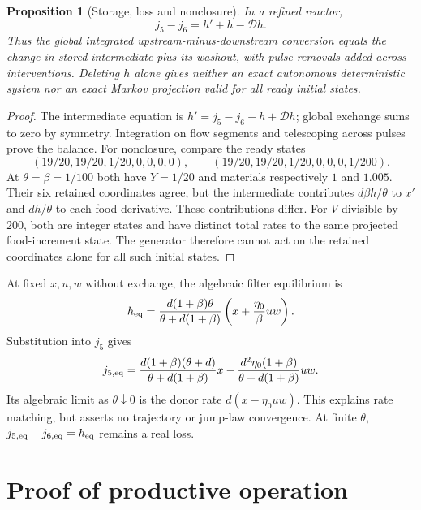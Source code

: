 \documentclass[11pt]{article}
\newtheorem{proposition}[theorem]{Proposition}
\theoremstyle{definition}\newtheorem{definition}[theorem]{Definition}
\begin{document}
\begin{proposition}[Storage, loss and nonclosure]\label{prop:storage}
In a refined reactor,
\[
j_5-j_6=h'+h-\mathcal Dh.
\]
Thus the global integrated upstream-minus-downstream conversion equals the change
in stored intermediate plus its washout, with pulse removals added across interventions.
Deleting $h$ alone gives neither an exact autonomous deterministic system nor an
exact Markov projection valid for all ready initial states.
\end{proposition}
\begin{proof}
The intermediate equation is $h'=j_5-j_6-h+\mathcal Dh$; global exchange sums to
zero by symmetry. Integration on flow segments and telescoping across pulses prove
the balance. For nonclosure, compare the ready states
\[
(19/20,19/20,1/20,0,0,0,0),\qquad
(19/20,19/20,1/20,0,0,0,1/200).
\]
At $\theta=\beta=1/100$ both have $Y=1/20$ and materials respectively $1$ and
$1.005$. Their six retained coordinates agree, but the intermediate contributes
$d\beta h/\theta$ to $x'$ and $dh/\theta$ to each food derivative. These contributions
differ. For $V$ divisible by $200$, both are integer states and have distinct total
rates to the same projected food-increment state. The generator therefore cannot
act on the retained coordinates alone for all such initial states.
\end{proof}
At fixed $x,u,w$ without exchange, the algebraic filter equilibrium is
\[
h_{\rm eq}=\frac{d(1+\beta)\theta}{\theta+d(1+\beta)}
\left(x+\frac{\eta_0}{\beta}uw\right).
\]
Substitution into $j_5$ gives
\[
j_{5,\rm eq}=\frac{d(1+\beta)(\theta+d)}{\theta+d(1+\beta)}x
-\frac{d^2\eta_0(1+\beta)}{\theta+d(1+\beta)}uw.
\]
Its algebraic limit as $\theta\downarrow0$ is the donor rate $d(x-\eta_0uw)$.
This explains rate matching, but asserts no trajectory or jump-law convergence.
At finite $\theta$, $j_{5,\rm eq}-j_{6,\rm eq}=h_{\rm eq}$ remains a real loss.

\section{Proof of productive operation}
\end{document}
